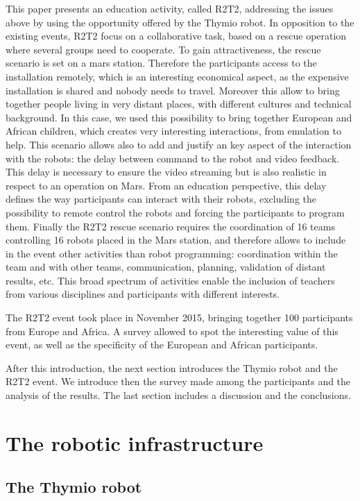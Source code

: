 \documentclass{intech-journal}
\begin{document}
This paper presents an education activity, called R2T2, addressing the issues above by using the opportunity offered by the Thymio robot. 
In opposition to the existing events, R2T2 focus on a collaborative task, based on a rescue operation where several groups need to cooperate.
To gain attractiveness, the rescue scenario is set on a mars station. 
Therefore the participants access to the installation remotely, which is an interesting economical aspect, as the expensive installation is shared and nobody needs to travel.
Moreover this allow to bring together people living in very distant places, with different cultures and technical background. In this case, we used this possibility to bring together European and African children, which creates very interesting interactions, from emulation to help.
This scenario allows also to add and justify an key aspect of the interaction with the robots: the delay between command to the robot and video feedback. 
This delay is necessary to ensure the video streaming but is also realistic in respect to an operation on Mars.
From an education perspective, this delay defines the way participants can interact with their robots, excluding the possibility to remote control the robots and forcing the participants to program them.
Finally the R2T2 rescue scenario requires the coordination of 16 teams controlling 16 robots placed in the Mars station, and therefore allows to include in the event other activities than robot programming: coordination within the team and with other teams, communication, planning, validation of distant results, etc.
This broad spectrum of activities enable the inclusion of teachers from various disciplines and participants with different interests.

The R2T2 event took place in November 2015, bringing together 100 participants from Europe and Africa. 
A survey allowed to spot the interesting value of this event, as well as the specificity of the European and African participants.

After this introduction, the next section introduces the Thymio robot and the R2T2 event. 
We introduce then the survey made among the participants and the analysis of the results. 
The last section includes a discussion and the conclusions.


\section{The robotic infrastructure}

\subsection{The Thymio robot}
\end{document}
